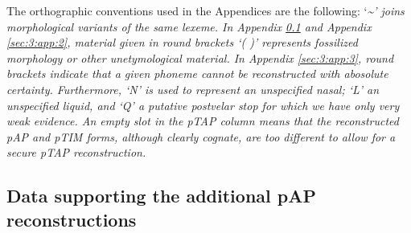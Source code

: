 \addtocounter{footnote}{-2}

The orthographic conventions used in the Appendices are the following: `\emph{\textup{\~{}' joins morphological variants of the same lexeme. In Appendix \ref{sec:3:app:1} and Appendix  \ref{sec:3:app:2}, material given in round brackets `( )' represents fossilized morphology or other unetymological material. In Appendix  \ref{sec:3:app:3}, round brackets indicate that a given phoneme cannot be reconstructed with abosolute certainty. Furthermore, `N' is used to represent an unspecified nasal; `L' an unspecified liquid, and `Q' a putative postvelar stop for which we have only very weak evidence. An empty slot in the pTAP column means that the reconstructed pAP and pTIM forms, although clearly cognate, are too different to allow for a secure pTAP reconstruction.} }


\startappendix
\subsection{Data supporting the additional pAP reconstructions}
\label{sec:3:app:1}
 



